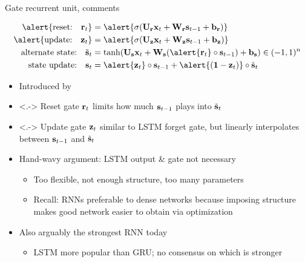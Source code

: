 \begin{frame}{Gate recurrent unit, comments}
    \begin{block}{}
        \vspace{-5mm}
        \begin{align*}
            \alert{\text{reset:} \quad \r_t} &= \alert{\sigma(\U_\r \x_t + \W_\r \s_{t-1} + \b_\r)} \\
            \alert{\text{update:} \quad \z_t} &= \alert{\sigma(\U_\z \x_t + \W_\z \s_{t-1} + \b_\z)} \\
            \text{alternate state:} \quad \st_t &= \tanh(\U_\s \x_t + \W_\s (\alert{\r_t} \circ \s_{t-1}) + \b_\s) \in (-1, 1)^n \\
            \text{state update:} \quad \s_t &= \alert{\z_t} \circ \s_{t-1} + \alert{(\one - \z_t)} \circ \st_t
        \end{align*}
    \end{block}

    \begin{itemize}
        \item<+-> Introduced by \citet{ChoEMNLP14}
        \item<.-> \alert{Reset gate $\mathbf{r}_t$} limits how much $\mathbf{s}_{t-1}$ plays into $\tilde{\mathbf{s}}_t$
        \item<.-> \alert{Update gate $\mathbf{z}_t$} similar to LSTM forget gate, but linearly interpolates between $\mathbf{s}_{t-1}$ and $\tilde{\mathbf{s}}_t$
        \item<+-> Hand-wavy argument: LSTM output \& gate not necessary
        \begin{itemize}
            \item Too flexible, not enough structure, too many parameters
            \item Recall: RNNs preferable to dense networks because imposing structure makes good network easier to obtain via optimization
        \end{itemize}
        \item<+-> Also arguably the strongest RNN today \citep{JozefowiczICML15}
        \begin{itemize}
            \item LSTM more popular than GRU; no consensus on which is stronger
        \end{itemize}
    \end{itemize}
\end{frame}

